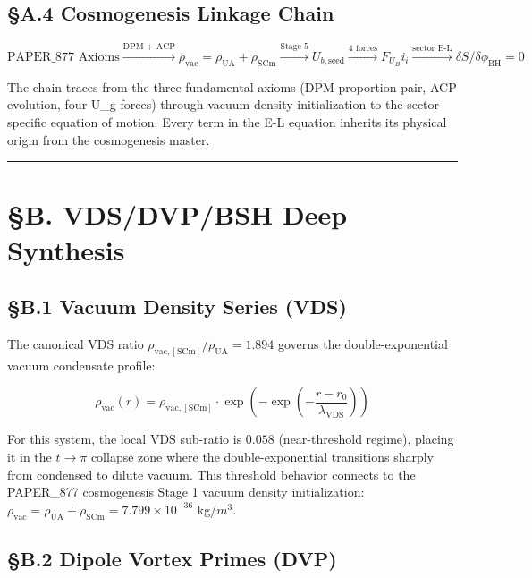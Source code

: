 \documentclass[12pt,a4paper]{article}
\begin{document}
\subsection{\S{}A.4 Cosmogenesis Linkage Chain}

\begin{equation}
\text{PAPER\_877 Axioms} \xrightarrow{\text{DPM + ACP}} \rho_{\mathrm{vac}} = \rho_{\mathrm{UA}} + \rho_{\mathrm{SCm}} \xrightarrow{\text{Stage 5}} U_{b,\mathrm{seed}} \xrightarrow{\text{4 forces}} F_U_Bi_i \xrightarrow{\text{sector E-L}} \delta S/\delta \phi_{\mathrm{BH}} = 0
\end{equation}

The chain traces from the three fundamental axioms (DPM proportion pair, ACP evolution, four U\_g forces) through vacuum density initialization to the sector-specific equation of motion. Every term in the E-L equation inherits its physical origin from the cosmogenesis master.

\medskip\hrule\medskip

\section{\S{}B. VDS/DVP/BSH Deep Synthesis}

\subsection{\S{}B.1 Vacuum Density Series (VDS)}

The canonical VDS ratio $\rho_{\mathrm{vac,[SCm]}} / \rho_{\mathrm{UA}} = 1.894$ governs the double-exponential vacuum condensate profile:

\begin{equation}
\rho_{\mathrm{vac}}(r) = \rho_{\mathrm{vac,[SCm]}} \cdot \exp\!\left(-\exp\!\left(-\frac{r - r_0}{\lambda_{\mathrm{VDS}}}\right)\right)
\end{equation}

For this system, the local VDS sub-ratio is $0.058$ (near-threshold regime), placing it in the $t \to \pi$ collapse zone where the double-exponential transitions sharply from condensed to dilute vacuum. This threshold behavior connects to the PAPER\_877 cosmogenesis Stage 1 vacuum density initialization: $\rho_{\mathrm{vac}} = \rho_{\mathrm{UA}} + \rho_{\mathrm{SCm}} = 7.799 \times 10^{-36}$ kg/$m^{3}$.

\subsection{\S{}B.2 Dipole Vortex Primes (DVP)}
\end{document}
